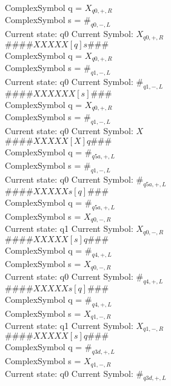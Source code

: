 \documentclass[10pt, a4paper]{article}
\begin{document}
ComplexSymbol q = $X_{q0,+,R}$ \\
ComplexSymbol s = $\#_{q0,-,L}$ \\ 
 \medskip
Current state: q0	 Current Symbol: 	 $X_{q0,+,R}$\\
$\# \#\# \# X X X X X [ q ] s \# \# \# $ \\
ComplexSymbol q = $X_{q0,+,R}$ \\
ComplexSymbol s = $\#_{q1,-,L}$ \\ 
 \medskip
Current state: q0	 Current Symbol: 	 $\#_{q1,-,L}$\\
$\# \#\# \# X X X X X X [ s ] \# \# \# $ \\
ComplexSymbol q = $X_{q0,+,R}$ \\
ComplexSymbol s = $\#_{q1,-,L}$ \\ 
 \medskip
Current state: q0	 Current Symbol: 	 $X$\\
$\# \#\# \# X X X X X [ X ] q \# \# \# $ \\
ComplexSymbol q = $\#_{q5a,+,L}$ \\
ComplexSymbol s = $\#_{q1,-,L}$ \\ 
 \medskip
Current state: q0	 Current Symbol: 	 $\#_{q5a,+,L}$\\
$\# \#\# \# X X X X X s [ q ] \# \# \# $ \\
ComplexSymbol q = $\#_{q5a,+,L}$ \\
ComplexSymbol s = $X_{q0,-,R}$ \\ 
 \medskip
Current state: q1	 Current Symbol: 	 $X_{q0,-,R}$\\
$\# \#\# \# X X X X X [ s ] q \# \# \# $ \\
ComplexSymbol q = $\#_{q4,+,L}$ \\
ComplexSymbol s = $X_{q0,-,R}$ \\ 
 \medskip
Current state: q0	 Current Symbol: 	 $\#_{q4,+,L}$\\
$\# \#\# \# X X X X X s [ q ] \# \# \# $ \\
ComplexSymbol q = $\#_{q4,+,L}$ \\
ComplexSymbol s = $X_{q1,-,R}$ \\ 
 \medskip
Current state: q1	 Current Symbol: 	 $X_{q1,-,R}$\\
$\# \#\# \# X X X X X [ s ] q \# \# \# $ \\
ComplexSymbol q = $\#_{q3d,+,L}$ \\
ComplexSymbol s = $X_{q1,-,R}$ \\ 
 \medskip
Current state: q0	 Current Symbol: 	 $\#_{q3d,+,L}$\\
\end{document}
